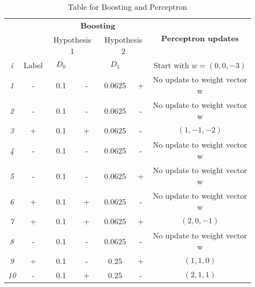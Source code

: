 \documentclass[11pt]{article}
\begin{document}
\begin{itemize}
  \begin{table}[h]
    {\centering
      \begin{tabular}{|c||c||c|c|c|c||c|}
        \hline
                 &       & \multicolumn{4}{c||}{\bf Boosting} & \multirow{2}{*}{\bf Perceptron updates}                            \\
        \cline{3-6}
                 &       & \multicolumn{2}{c|}{Hypothesis 1}  & \multicolumn{2}{c||}{Hypothesis 2} &                               \\
        \cline{3-7}
        {\em i}  & Label & $D_0$                              &                                    & $D_1$ &  & Start with $w=(0,0,-3)$ \\
        \hline 
        {\em 1}  &   -    &  0.1                                  &                              -      & 0.0625      & + &     No update to weight vector w \\
        \hline
        {\em 2}  &   -    &  0.1                                  &                              -      & 0.0625      & - &     No update to weight vector w\\
        \hline
        {\em 3}  &   +    &  0.1                                  &                              +      & 0.0625      & - &     $(1,-1,-2)$ \\
        \hline
        {\em 4}  &   -    &  0.1                                  &                              -      & 0.0625      & - &     No update to weight vector  w\\
        \hline
        {\em 5}  &   -    &  0.1                                  &                              -      & 0.0625      & + &    No update to weight vector w\\
        \hline
        {\em 6}  &   +    & 0.1                                   &                              +      & 0.0625      & - &    No update to weight vector w \\
        \hline
        {\em 7}  &   +    & 0.1                                 &                                +    &  0.0625     & + &     $(2,0,-1)$\\
        \hline
        {\em 8}  &   -    &  0.1                                  &                              -      & 0.0625      & - &   No update to weight vector w\\
        \hline
        {\em 9}  &   +    &  0.1                                  &                              -      & 0.25      & + &      $(1,1,0)$              \\
        \hline
        {\em 10} &   -    &  0.1                                  &                              +      &  0.25     & - &      $(2,1,1)$              \\
        \hline
      \end{tabular}
      \caption{Table for Boosting and Perceptron} \label{table:ltu}}
\end{table}
    

\end{itemize}
\end{document}

